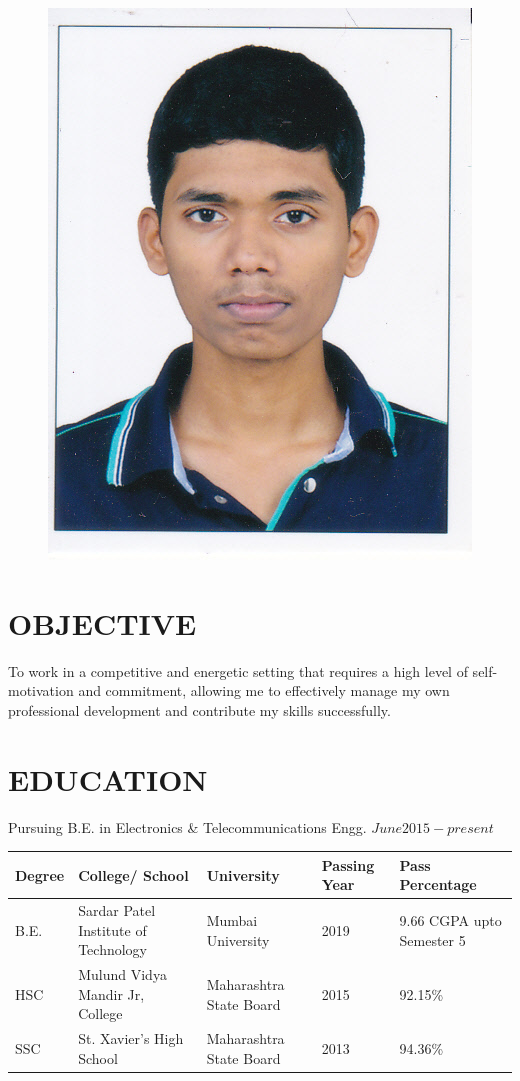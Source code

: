 \documentclass[margin]{res}
\begin{document}

\address{302 Matoshree Pearl\\Shree Rameshwar CHS\\Opp. Dreams Mall, LBS Marg\\Bhandup(W)\\Mumbai-400078} 

\address{Contact No. +91 9867906725\\
Email id: shedekarhrishi@gmail.com} 


\begin{resume}


\begin{figure}[ht]
    \includegraphics[width=.3\textwidth,right]{me}
\end{figure}

\section{OBJECTIVE}  

To work in a competitive and energetic setting that requires a high level of self-motivation and commitment, allowing me to effectively manage my own professional development and contribute my skills successfully.


\section{EDUCATION}


Pursuing B.E. in Electronics \& Telecommunications Engg. \hfill \(June 2015 - present\)
\begin{flushleft}
\begin{tabular}{ |m{3em}|m{10em}|m{6em}|m{4em}|m{8em}| } 
 \hline
\textbf{Degree} & \textbf{College/ School} & \textbf{University} & \textbf{Passing Year} & \textbf{Pass}\hspace{16mm} \textbf{Percentage}\\
 \hline 
 B.E. & Sardar Patel Institute of Technology & Mumbai \hspace{10mm}University & 2019 & 9.66 CGPA upto Semester 5 \\ 
 \hline
  HSC & Mulund Vidya Mandir Jr, College & Maharashtra State Board & 2015 & 92.15\% \\ 
 \hline
 SSC & St. Xavier's High School & Maharashtra State Board & 2013 & 94.36\% \\ 
 \hline
 
\end{tabular}
\end{flushleft}



\end{resume}
\end{document}
